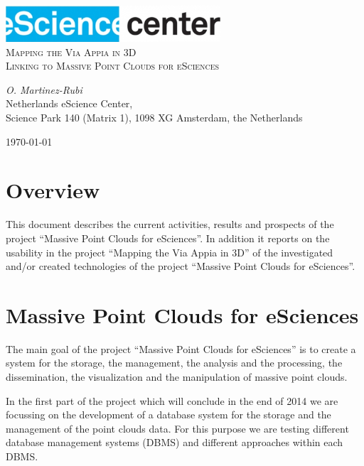 \documentclass[a4paper,11pt]{article}
\begin{document}
\begin{titlepage}
\begin{center}
\includegraphics[width=0.6\textwidth]{fig/logo}\\[3cm]    
\textsc{\LARGE Mapping the Via Appia in 3D}\\[0.5cm]
\textsc{\large Linking to Massive Point Clouds for eSciences }\\[0.5cm]
\vfill
\end{center}
{\large
\emph{O. Martinez-Rubi } \\
}
{\large
{Netherlands eScience Center, \\
Science Park 140 (Matrix 1), 1098 XG Amsterdam, the Netherlands\\
}
}
\begin{center}
{\large \today}
\end{center}
\end{titlepage}


\section{Overview}

This document describes the current activities, results and prospects of the project ``Massive Point Clouds for eSciences''. In addition it reports on the usability in the project ``Mapping the Via Appia in 3D'' of the investigated and/or created technologies of the project ``Massive Point Clouds for eSciences''.

\section{Massive Point Clouds for eSciences}

The main goal of the project ``Massive Point Clouds for eSciences'' is to create a system for the storage, the management, the analysis and the processing, the dissemination, the visualization and the manipulation of massive point clouds.

In the first part of the project which will conclude in the end of 2014 we are focussing on the development of a database system for the storage and the management of the point clouds data. For this purpose we are testing different database management systems (DBMS) and different approaches within each DBMS.
\end{document}
